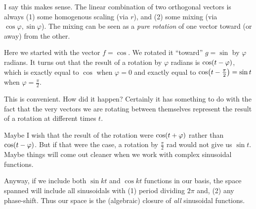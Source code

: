 I say this makes sense. The linear combination of two orthogonal vectors
is always (1) some homogenous scaling (via $r$), and (2) some mixing
(via $\cos\varphi, \sin\varphi$). The mixing can be seen as a \emph{pure
rotation} of one vector toward (or away) from the other.

Here we started with the vector $f = \cos$. We rotated it ``toward'' $g
= \sin$ by $\varphi$ radians. It turns out that the result of a rotation
by $\varphi$ radians is $\cos\mathopen{}\left( {t - \varphi} \right)\mathclose{}$, which is exactly equal to
$\cos$ when $\varphi = 0$ and exactly equal to $\cos\mathopen{}\left( {t - \frac{\pi}{2}} \right)\mathclose{}
= \sin t$ when $\varphi = \frac{\pi}{2}$.

This is convenient. How did it happen? Certainly it has something to do
with the fact that the very vectors we are rotating between themselves
represent the result of a rotation at different times $t$.

Maybe I wish that the result of the rotation were $\cos\mathopen{}\left( {t + \varphi} \right)\mathclose{}$
rather than $\cos\mathopen{}\left( {t - \varphi} \right)\mathclose{}$. But if that were the case, a rotation
by $\frac{\pi}{2}$ rad would not give us $\sin t$. Maybe things will
come out cleaner when we work with complex sinusoidal functions.

Anyway, if we include both $\sin kt$ and $\cos kt$ functions in our
basis, the space spanned will include all sinusoidals with (1) period
dividing $2\pi$ and, (2) any phase-shift. Thus our space is the
(algebraic) closure of \emph{all} sinusoidal functions.
